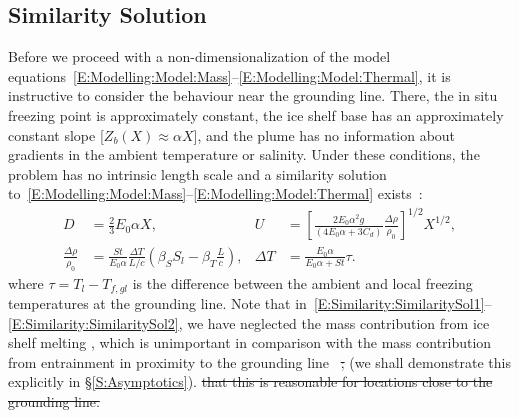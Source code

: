 \documentclass[openacc]{rsproca_new}%
\newcommand{\red}[1]{{\color{red} #1}}
\newcommand{\blue}[1]{{\color{blue} #1}}
\newcommand{\rout}[1]{\red{\st{#1}}}\newcommand{\ab}[1]{\textcolor{Green}{#1}}\newcommand{\about}[1]{\textcolor{Cyan}{\sout{#1}}}
\begin{document}
\subsection{Similarity Solution}\label{S:Model:SimilaritySolution}
Before we proceed with a non-dimensionalization of the model equations~\eqref{E:Modelling:Model:Mass}--\eqref{E:Modelling:Model:Thermal}, it is instructive to consider the behaviour near the grounding line. There, the in situ freezing point is approximately constant, the ice shelf base has an approximately constant slope [$Z_b(X) \approx \alpha X$], and the plume has no information about gradients in the ambient temperature or salinity. Under these conditions, the problem has no intrinsic length scale and a similarity solution to~\eqref{E:Modelling:Model:Mass}--\eqref{E:Modelling:Model:Thermal} exists~\cite{Magorrian2016JGeoResOcean}:
\begin{align}
D &= \frac{2}{3}E_0 \alpha X, & U &= \left[\frac{2E_0 \alpha^2 g}{\left(4E_0 \alpha + 3 C_d\right)} \frac{\Delta \rho}{\rho_0}\right]^{1/2}X^{1/2},\label{E:Similarity:SimilaritySol1}\\
 \frac{\Delta \rho}{\rho_0} &= \frac{St}{E_0 \alpha}\frac{\Delta T}{L/c}\left(\beta_S S_l - \beta_T \frac{L}{c}\right), & \Delta T &= \frac{E_0 \alpha}{E_0 \alpha + St}\tau.\label{E:Similarity:SimilaritySol2}
\end{align}
where $\tau = T_l - T_{f,gl}$ is the difference between the ambient and local freezing temperatures at the grounding line. Note that in~\eqref{E:Similarity:SimilaritySol1}--\eqref{E:Similarity:SimilaritySol2}, we have neglected the mass contribution from ice shelf melting\blue{, which is unimportant in comparison with the mass contribution from entrainment in proximity to the grounding line~\cite{Hewitt2020AnnRevFlu}}\rout{;} \blue{(we shall demonstrate this explicitly in \S\ref{S:Asymptotics}).} \rout{ that this is reasonable for locations close to the grounding line.}
\end{document}
